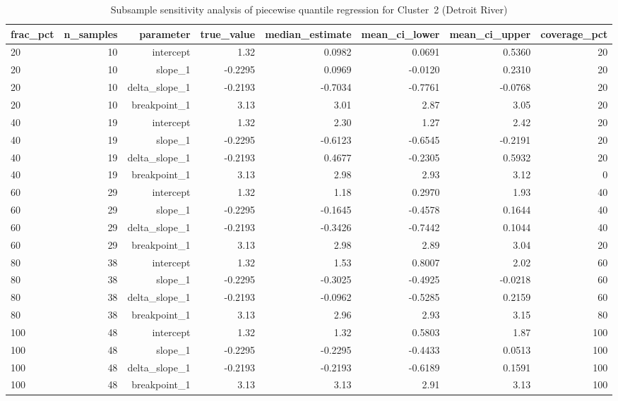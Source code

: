 \begin{table}[htbp]
  \centering
  \caption{Subsample sensitivity analysis of piecewise quantile regression for Cluster~2 (Detroit River)}
  \label{tab:dr_05_piecewise_qr_sensitivity_cluster_2}
  \small
  \begin{tabular}{lrrrrrrr}
    \toprule
    frac\_pct & n\_samples & parameter & true\_value & median\_estimate & mean\_ci\_lower & mean\_ci\_upper & coverage\_pct \\
    \midrule
    20 & 10 & intercept & 1.32 & 0.0982 & 0.0691 & 0.5360 & 20 \\
    20 & 10 & slope\_1 & -0.2295 & 0.0969 & -0.0120 & 0.2310 & 20 \\
    20 & 10 & delta\_slope\_1 & -0.2193 & -0.7034 & -0.7761 & -0.0768 & 20 \\
    20 & 10 & breakpoint\_1 & 3.13 & 3.01 & 2.87 & 3.05 & 20 \\
    40 & 19 & intercept & 1.32 & 2.30 & 1.27 & 2.42 & 20 \\
    40 & 19 & slope\_1 & -0.2295 & -0.6123 & -0.6545 & -0.2191 & 20 \\
    40 & 19 & delta\_slope\_1 & -0.2193 & 0.4677 & -0.2305 & 0.5932 & 20 \\
    40 & 19 & breakpoint\_1 & 3.13 & 2.98 & 2.93 & 3.12 & 0 \\
    60 & 29 & intercept & 1.32 & 1.18 & 0.2970 & 1.93 & 40 \\
    60 & 29 & slope\_1 & -0.2295 & -0.1645 & -0.4578 & 0.1644 & 40 \\
    60 & 29 & delta\_slope\_1 & -0.2193 & -0.3426 & -0.7442 & 0.1044 & 40 \\
    60 & 29 & breakpoint\_1 & 3.13 & 2.98 & 2.89 & 3.04 & 20 \\
    80 & 38 & intercept & 1.32 & 1.53 & 0.8007 & 2.02 & 60 \\
    80 & 38 & slope\_1 & -0.2295 & -0.3025 & -0.4925 & -0.0218 & 60 \\
    80 & 38 & delta\_slope\_1 & -0.2193 & -0.0962 & -0.5285 & 0.2159 & 60 \\
    80 & 38 & breakpoint\_1 & 3.13 & 2.96 & 2.93 & 3.15 & 80 \\
    100 & 48 & intercept & 1.32 & 1.32 & 0.5803 & 1.87 & 100 \\
    100 & 48 & slope\_1 & -0.2295 & -0.2295 & -0.4433 & 0.0513 & 100 \\
    100 & 48 & delta\_slope\_1 & -0.2193 & -0.2193 & -0.6189 & 0.1591 & 100 \\
    100 & 48 & breakpoint\_1 & 3.13 & 3.13 & 2.91 & 3.13 & 100 \\
    \bottomrule
  \end{tabular}
\end{table}
